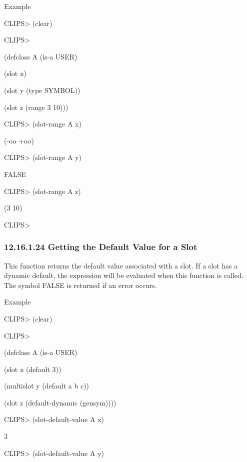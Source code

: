 \documentclass[letterpaper,10pt,english]{sphinxmanual}
\begin{document}
Example

CLIPS\textgreater{} (clear)

CLIPS\textgreater{}

(defclass A (is-a USER)

(slot x)

(slot y (type SYMBOL))

(slot z (range 3 10)))

CLIPS\textgreater{} (slot-range A x)

(-oo +oo)

CLIPS\textgreater{} (slot-range A y)

FALSE

CLIPS\textgreater{} (slot-range A z)

(3 10)

CLIPS\textgreater{}


\subsubsection{12.16.1.24 Getting the Default Value for a Slot}
\label{\detokenize{actions:getting-the-default-value-for-a-slot}}
This function returns the default value associated with a slot. If a
slot has a dynamic default, the expression will be evaluated when this
function is called. The symbol FALSE is returned if an error occurs.


\begin{sphinxVerbatim}[commandchars=\\\{\}]
  
\end{sphinxVerbatim}

Example

CLIPS\textgreater{} (clear)

CLIPS\textgreater{}

(defclass A (is-a USER)

(slot x (default 3))

(multislot y (default a b c))

(slot z (default-dynamic (gensym))))

CLIPS\textgreater{} (slot-default-value A x)

3

CLIPS\textgreater{} (slot-default-value A y)
\end{document}
